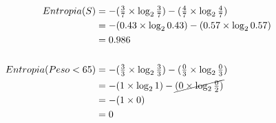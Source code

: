 \documentclass[
    article,            %
    11pt,               %
    oneside,            %
    a4paper,            %
    english,            %
    brazil,             %
    sumario=tradicional,
    ]{abntex2}
\begin{document}
\begin{align*}
Entropia(S) &= - (\tfrac{3}{7} \times \log_2 \tfrac{3}{7}) - (\tfrac{4}{7} \times \log_2 \tfrac{4}{7})   \\ 
            &= - (0.43 \times \log_2 0.43) - (0.57 \times \log_2 0.57)                                   \\
            &= 0.986                                                                                   \\\\
Entropia(Peso <65) &= - (\tfrac{3}{3} \times \log_2 \tfrac{3}{3}) - (\tfrac{0}{3} \times \log_2 \tfrac{0}{3}) \\ 
            &= - (1 \times \log_2 1) - \cancel{(0 \times \log_2 \tfrac{0}{2})}                         \\
            &= - (1 \times 0)                                                                          \\
            &= 0                                                                                     \\\\      
\end{align*}
\end{document}
